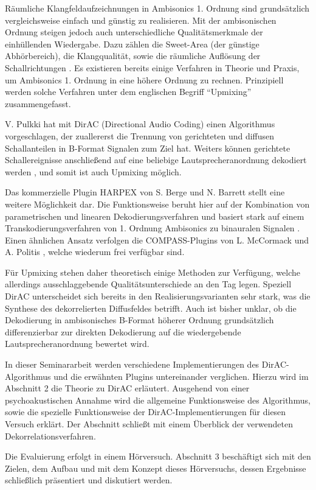 Räumliche Klangfeldaufzeichnungen in Ambisonics 1. Ordnung sind grundsätzlich vergleichsweise einfach und günstig zu realisieren. Mit der ambisonischen Ordnung steigen jedoch auch unterschiedliche Qualitätsmerkmale der einhüllenden Wiedergabe. Dazu zählen die Sweet-Area (der günstige Abhörbereich), die Klangqualität, sowie die räumliche Auflösung der Schallrichtungen \cite{ambi-book}. Es existieren bereits einige Verfahren in Theorie und Praxis, um Ambisonics 1. Ordnung in eine höhere Ordnung zu rechnen. Prinzipiell werden solche Verfahren unter dem englischen Begriff ``Upmixing'' zusammengefasst.

V. Pulkki hat mit DirAC (Directional Audio Coding) \cite{pulkki} einen Algorithmus vorgeschlagen, der zuallererst die Trennung von gerichteten und diffusen Schallanteilen in B-Format Signalen zum Ziel hat. Weiters können gerichtete Schallereignisse anschließend auf eine beliebige Lautsprecheranordnung dekodiert werden \cite{spatial-book}, und somit ist auch Upmixing möglich.

Das kommerzielle Plugin HARPEX von S. Berge und N. Barrett stellt eine weitere Möglichkeit dar. Die Funktionsweise beruht hier auf der Kombination von parametrischen und linearen Dekodierungsverfahren \cite{harpy2} und basiert stark auf einem Transkodierungsverfahren von 1. Ordnung Ambisonics zu binauralen Signalen \cite{harpy}. Einen ähnlichen Ansatz verfolgen die COMPASS-Plugins von L. McCormack und A. Politis \cite{compy}, welche wiederum frei verfügbar sind.

Für Upmixing stehen daher theoretisch einige Methoden zur Verfügung, welche allerdings ausschlaggebende Qualitätsunterschiede an den Tag legen. Speziell DirAC unterscheidet sich bereits in den Realisierungsvarianten sehr stark, was die Synthese des dekorrelierten Diffusfeldes betrifft. Auch ist bisher unklar, ob die Dekodierung in ambisonisches B-Format höherer Ordnung grundsätzlich differenzierbar zur direkten Dekodierung auf die wiedergebende Lautsprecheranordnung bewertet wird.

In dieser Seminararbeit werden verschiedene Implementierungen des DirAC-Algorithmus und die erwähnten Plugins untereinander verglichen. Hierzu wird im Abschnitt 2 die Theorie zu DirAC erläutert. Ausgehend von einer psychoakustischen Annahme wird die allgemeine Funktionsweise des Algorithmus, sowie die spezielle Funktionsweise der DirAC-Implementierungen für diesen Versuch erklärt. Der Abschnitt schließt mit einem Überblick der verwendeten Dekorrelationsverfahren.

Die Evaluierung erfolgt in einem Hörversuch. Abschnitt 3 beschäftigt sich mit den Zielen, dem Aufbau und mit dem Konzept dieses Hörversuchs, dessen Ergebnisse schließlich präsentiert und diskutiert werden.
